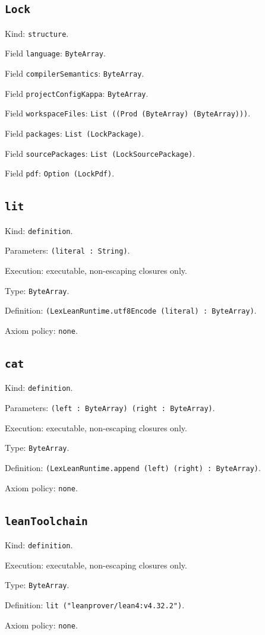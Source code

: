 \documentclass[11pt]{article}
\begin{document}
\subsection*{\texttt{Lock}}
\noindent Kind: \texttt{structure}.\par
\noindent Field \texttt{language}: \texttt{ByteArray}.\par
\noindent Field \texttt{compilerSemantics}: \texttt{ByteArray}.\par
\noindent Field \texttt{projectConfigKappa}: \texttt{ByteArray}.\par
\noindent Field \texttt{workspaceFiles}: \texttt{List ((Prod (ByteArray) (ByteArray)))}.\par
\noindent Field \texttt{packages}: \texttt{List (LockPackage)}.\par
\noindent Field \texttt{sourcePackages}: \texttt{List (LockSourcePackage)}.\par
\noindent Field \texttt{pdf}: \texttt{Option (LockPdf)}.\par
\subsection*{\texttt{lit}}
\noindent Kind: \texttt{definition}.\par
\noindent Parameters: \texttt{(literal : String)}.\par
\noindent Execution: executable, non-escaping closures only.\par
\noindent Type: \texttt{ByteArray}.\par
\noindent Definition: \texttt{(LexLeanRuntime.utf8Encode (literal) : ByteArray)}.\par
\noindent Axiom policy: \texttt{none}.\par
\subsection*{\texttt{cat}}
\noindent Kind: \texttt{definition}.\par
\noindent Parameters: \texttt{(left : ByteArray) (right : ByteArray)}.\par
\noindent Execution: executable, non-escaping closures only.\par
\noindent Type: \texttt{ByteArray}.\par
\noindent Definition: \texttt{(LexLeanRuntime.append (left) (right) : ByteArray)}.\par
\noindent Axiom policy: \texttt{none}.\par
\subsection*{\texttt{leanToolchain}}
\noindent Kind: \texttt{definition}.\par
\noindent Execution: executable, non-escaping closures only.\par
\noindent Type: \texttt{ByteArray}.\par
\noindent Definition: \texttt{lit ("leanprover/lean4:v4.32.2")}.\par
\noindent Axiom policy: \texttt{none}.\par
\end{document}
